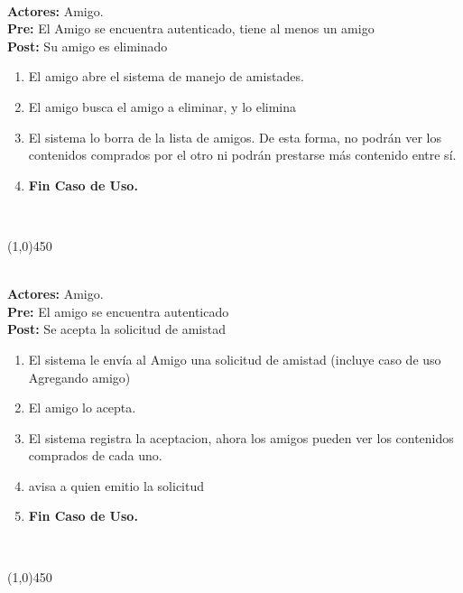 \documentclass[11pt, a4paper, spanish]{article}
\begin{document}
	 \\
\textbf{Actores:} Amigo. \\
\textbf{Pre:} El Amigo se encuentra autenticado, tiene al menos un amigo \\
\textbf{Post:} Su amigo es eliminado\\
\begin{enumerate}
	\item El amigo abre el sistema de manejo de amistades.
\item El amigo busca el amigo a eliminar, y lo elimina	
 \item El sistema lo borra de la lista de amigos. De esta forma, no podrán ver los contenidos comprados por el otro ni podrán prestarse más contenido entre sí.
\item \textbf{Fin Caso de Uso.} \\
\end{enumerate}

 \\
\begin{center} \line(1,0){450} \end{center}



 \\
\textbf{Actores:}  Amigo. \\
\textbf{Pre:} El amigo se encuentra autenticado \\
\textbf{Post:} Se acepta la solicitud de amistad\\
\begin{enumerate}
	\item El sistema le envía al Amigo una solicitud de amistad (incluye caso de uso Agregando amigo)
\item El amigo lo acepta.
\item El sistema registra la aceptacion, ahora los amigos pueden ver los contenidos comprados de cada uno.
\item avisa a quien emitio la solicitud
\item \textbf{Fin Caso de Uso.} \\

\end{enumerate}
 \\
\begin{center} \line(1,0){450} \end{center}
\end{document}
